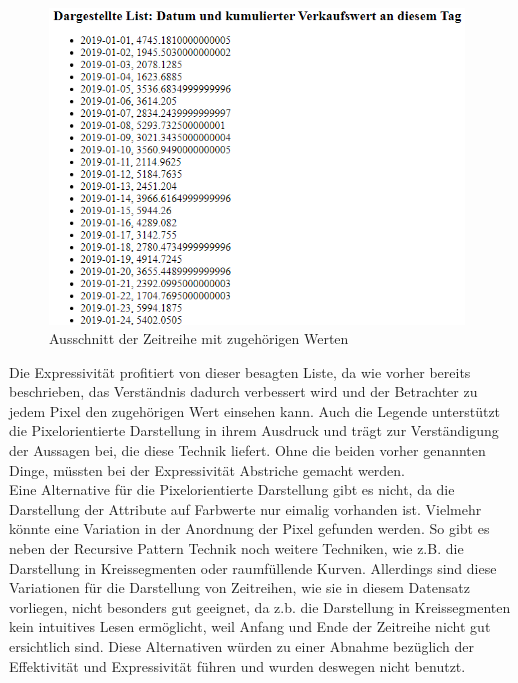 \documentclass[usegeometry=true]{scrartcl}
\begin{document}
\begin{figure} [H]
	\begin{center}
		\includegraphics[width=11cm]{IMG/Zeitreihe}
		\caption{Ausschnitt der Zeitreihe mit zugehörigen Werten}
		\label{fig:Zeitreihe}
	\end{center}
\end{figure}

\noindent Die Expressivität profitiert von dieser besagten Liste, da wie vorher bereits beschrieben, das Verständnis dadurch verbessert wird und der Betrachter zu jedem Pixel den zugehörigen
Wert einsehen kann. Auch die Legende unterstützt die Pixelorientierte Darstellung in ihrem Ausdruck und trägt zur Verständigung der Aussagen bei, die diese Technik liefert. Ohne
die beiden vorher genannten Dinge, müssten bei der Expressivität Abstriche gemacht werden. \\

\noindent Eine Alternative für die Pixelorientierte Darstellung gibt es nicht, da die Darstellung der Attribute auf Farbwerte nur eimalig vorhanden ist. Vielmehr könnte eine
Variation in der Anordnung der Pixel gefunden werden. So gibt es neben der Recursive Pattern Technik noch weitere Techniken, wie z.B. die Darstellung in Kreissegmenten oder
raumfüllende Kurven. \cite[5]{yeqiang2017visualizing} Allerdings sind diese Variationen für die Darstellung von Zeitreihen, wie sie in diesem Datensatz vorliegen, nicht besonders
gut geeignet, da z.b. die Darstellung in Kreissegmenten kein intuitives Lesen ermöglicht, weil Anfang und Ende der Zeitreihe nicht gut ersichtlich sind. Diese Alternativen würden
zu einer Abnahme bezüglich der Effektivität und Expressivität führen und wurden deswegen nicht benutzt.
\end{document}
